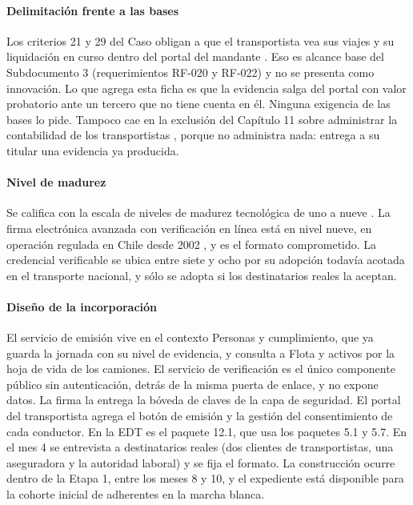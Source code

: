 \paragraph{Delimitación frente a las bases} Los criterios 21 y 29 del Caso obligan a que el
transportista vea sus viajes y su liquidación en curso dentro del portal del mandante . Eso es alcance base del Subdocumento 3 (requerimientos RF-020 y RF-022) y no se presenta
como innovación. Lo que agrega esta ficha es que la evidencia salga del portal con valor probatorio ante
un tercero que no tiene cuenta en él. Ninguna exigencia de las bases lo pide. Tampoco cae en la
exclusión del Capítulo 11 sobre administrar la contabilidad de los transportistas , porque no administra nada: entrega a su titular una evidencia ya producida.

\paragraph{Nivel de madurez} Se califica con la escala de niveles de madurez tecnológica de uno a nueve
\parencite{iso16290}. La firma electrónica avanzada con verificación en línea está en nivel nueve, en
operación regulada en Chile desde 2002 \parencite{ley19799}, y es el formato comprometido. La
credencial verificable se ubica entre siete y ocho por su adopción todavía acotada en el transporte
nacional, y sólo se adopta si los destinatarios reales la aceptan.

\paragraph{Diseño de la incorporación} El servicio de emisión vive en el contexto Personas y
cumplimiento, que ya guarda la jornada con su nivel de evidencia, y consulta a Flota y activos por la
hoja de vida de los camiones. El servicio de verificación es el único componente público sin
autenticación, detrás de la misma puerta de enlace, y no expone datos. La firma la entrega la bóveda de
claves de la capa de seguridad. El portal del transportista agrega el botón de emisión y la gestión del
consentimiento de cada conductor. En la EDT es el paquete 12.1, que usa los paquetes 5.1 y 5.7. En el
mes 4 se entrevista a destinatarios reales (dos clientes de transportistas, una aseguradora y la
autoridad laboral) y se fija el formato. La construcción ocurre dentro de la Etapa 1, entre los meses 8
y 10, y el expediente está disponible para la cohorte inicial de adherentes en la marcha blanca.

